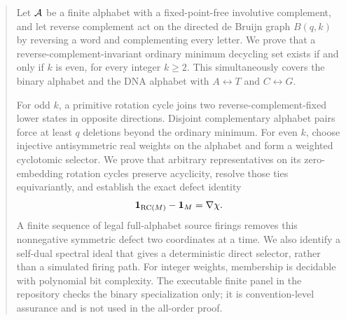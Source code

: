 \begin{abstract}
Let $\A$ be a finite alphabet with a fixed-point-free involutive complement,
and let reverse complement act on the directed de Bruijn graph $B(q,k)$ by
reversing a word and complementing every letter.  We prove that a
reverse-complement-invariant ordinary minimum decycling set exists if and
only if $k$ is even, for every integer $k\geq2$.  This simultaneously covers
the binary alphabet and the DNA alphabet with $A\leftrightarrow T$ and
$C\leftrightarrow G$.

For odd $k$, a primitive rotation cycle joins two reverse-complement-fixed
lower states in opposite directions. Disjoint complementary alphabet pairs
force at least $q$ deletions beyond the ordinary minimum. For even $k$,
choose injective antisymmetric real weights on
the alphabet and form a weighted cyclotomic selector.  We prove that
arbitrary representatives on its zero-embedding rotation cycles preserve
acyclicity, resolve those ties equivariantly, and establish the exact defect
identity
\[
  \ind_{\RC(M)}-\ind_M=\nabla\chi .
\]
A finite sequence of legal full-alphabet source firings removes this
nonnegative symmetric defect two coordinates at a time.  We also identify a
self-dual spectral ideal that gives a deterministic direct selector, rather
than a simulated firing path.  For integer weights, membership is decidable
with polynomial bit complexity.  The executable finite panel in the repository
checks the binary specialization only; it is convention-level assurance and
is not used in the all-order proof.
\end{abstract}
